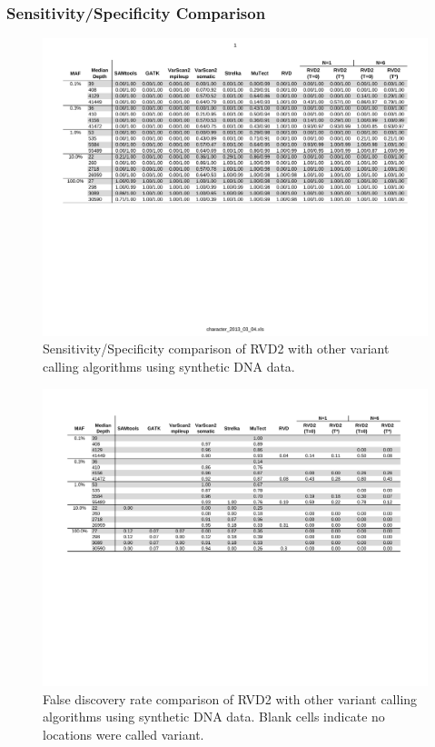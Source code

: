 \documentclass{bioinfo}
\begin{document}
\subsubsection*{Sensitivity/Specificity Comparison}

\begin{figure}[!htpb]
\begin{center}
\includegraphics[width=1\textwidth]{pdf_figs/comparison_table_ss.pdf}
\caption{Sensitivity/Specificity comparison of RVD2 with other variant calling algorithms using synthetic DNA data.}
\label{tbl:comparison_ss}
\end{center}
\end{figure}

\begin{figure}[!tbhp]
\begin{center}
\includegraphics[width=1\textwidth]{pdf_figs/comparison_table_fdr.pdf}
\caption{False discovery rate comparison of RVD2 with other variant calling algorithms using synthetic DNA data. Blank cells indicate no locations were called variant.}
\label{tbl:comparison_fdr}
\end{center}
\end{figure}
\end{document}
